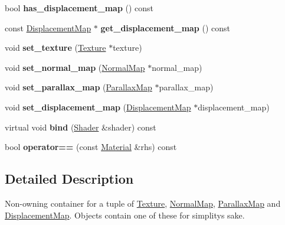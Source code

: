 \begin{DoxyCompactItemize}
\item 
\mbox{\label{class_material_a02a7a36f8914ab673c956f72f2567099}} 
bool {\bfseries has\+\_\+displacement\+\_\+map} () const
\item 
\mbox{\label{class_material_a13740af80c449e957271d6a47db93c44}} 
const \mbox{\hyperlink{class_displacement_map}{Displacement\+Map}} $\ast$ {\bfseries get\+\_\+displacement\+\_\+map} () const
\item 
\mbox{\label{class_material_a249d65e23e1b214c13d8ff3b60abd2db}} 
void {\bfseries set\+\_\+texture} (\mbox{\hyperlink{class_texture}{Texture}} $\ast$texture)
\item 
\mbox{\label{class_material_a0a3f8735d6b8843cd4a7c3f598a147de}} 
void {\bfseries set\+\_\+normal\+\_\+map} (\mbox{\hyperlink{class_normal_map}{Normal\+Map}} $\ast$normal\+\_\+map)
\item 
\mbox{\label{class_material_a8f324d2f579e680798ec07527446a525}} 
void {\bfseries set\+\_\+parallax\+\_\+map} (\mbox{\hyperlink{class_parallax_map}{Parallax\+Map}} $\ast$parallax\+\_\+map)
\item 
\mbox{\label{class_material_a292bc6429310ce4db4a1282d40aca36c}} 
void {\bfseries set\+\_\+displacement\+\_\+map} (\mbox{\hyperlink{class_displacement_map}{Displacement\+Map}} $\ast$displacement\+\_\+map)
\item 
\mbox{\label{class_material_a0053a121698c3c5af8e889204d3b80cf}} 
virtual void {\bfseries bind} (\mbox{\hyperlink{class_shader}{Shader}} \&shader) const
\item 
\mbox{\label{class_material_aa0519b7438e5ebdcc86d17817c96016d}} 
bool {\bfseries operator==} (const \mbox{\hyperlink{class_material}{Material}} \&rhs) const
\end{DoxyCompactItemize}


\subsection{Detailed Description}
Non-\/owning container for a tuple of \mbox{\hyperlink{class_texture}{Texture}}, \mbox{\hyperlink{class_normal_map}{Normal\+Map}}, \mbox{\hyperlink{class_parallax_map}{Parallax\+Map}} and \mbox{\hyperlink{class_displacement_map}{Displacement\+Map}}. Objects contain one of these for simplity\textquotesingle{}s sake. 

